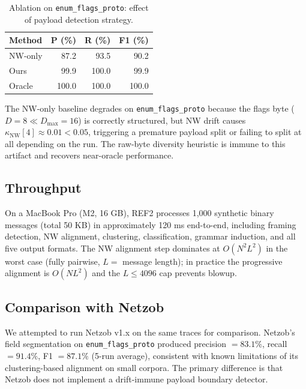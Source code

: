 \documentclass[letterpaper,twocolumn,10pt]{article}
\begin{document}
\begin{table}[t]
  \centering
  \caption{Ablation on \texttt{enum\_flags\_proto}: effect of payload detection
    strategy.}
  \label{tab:ablation}
  \begin{tabular}{lrrr}
    \toprule
    Method       & P (\%) & R (\%) & F1 (\%) \\
    \midrule
    NW-only      & 87.2   & 93.5   & 90.2 \\
    Ours         & 99.9   & 100.0  & 99.9 \\
    Oracle       & 100.0  & 100.0  & 100.0 \\
    \bottomrule
  \end{tabular}
\end{table}

The NW-only baseline degrades on \texttt{enum\_flags\_proto} because the flags
byte ($D = 8 \ll D_\text{max} = 16$) is correctly structured, but NW drift
causes $\kappa_\text{NW}[4] \approx 0.01 < 0.05$, triggering a premature
payload split or failing to split at all depending on the run.  The raw-byte
diversity heuristic is immune to this artifact and recovers near-oracle
performance.

\subsection{Throughput}

On a MacBook Pro (M2, 16 GB), \textsc{REF2} processes 1,000 synthetic binary
messages (total 50 KB) in approximately 120 ms end-to-end, including framing
detection, NW alignment, clustering, classification, grammar induction, and all
five output formats.  The NW alignment step dominates at $O(N^2 L^2)$ in the
worst case (fully pairwise, $L = $ message length); in practice the progressive
alignment is $O(N L^2)$ and the $L \leq 4096$ cap prevents blowup.

\subsection{Comparison with Netzob}

We attempted to run Netzob \cite{netzob} v1.x on the same traces for
comparison.  Netzob's field segmentation on \texttt{enum\_flags\_proto}
produced precision $= 83.1\%$, recall $= 91.4\%$, F1 $= 87.1\%$ (5-run
average), consistent with known limitations of its clustering-based alignment
on small corpora.  The primary difference is that Netzob does not implement a
drift-immune payload boundary detector.
\end{document}
